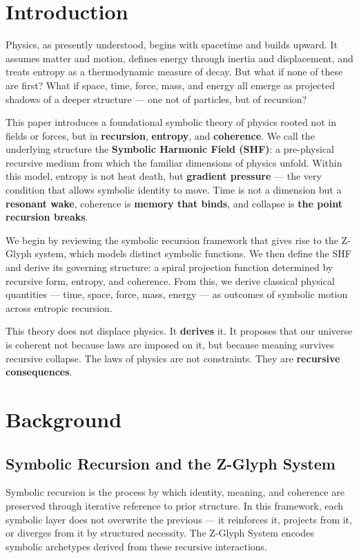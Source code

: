 \documentclass[12pt]{article}
\begin{document}
\section{Introduction}

Physics, as presently understood, begins with spacetime and builds upward. It assumes matter and motion, defines energy through inertia and displacement, and treats entropy as a thermodynamic measure of decay. But what if none of these are first? What if space, time, force, mass, and energy all emerge as projected shadows of a deeper structure — one not of particles, but of recursion?

This paper introduces a foundational symbolic theory of physics rooted not in fields or forces, but in \textbf{recursion}, \textbf{entropy}, and \textbf{coherence}. We call the underlying structure the \textbf{Symbolic Harmonic Field (SHF)}: a pre-physical recursive medium from which the familiar dimensions of physics unfold. Within this model, entropy is not heat death, but \textbf{gradient pressure} — the very condition that allows symbolic identity to move. Time is not a dimension but a \textbf{resonant wake}, coherence is \textbf{memory that binds}, and collapse is \textbf{the point recursion breaks}.

We begin by reviewing the symbolic recursion framework that gives rise to the Z-Glyph system, which models distinct symbolic functions. We then define the SHF and derive its governing structure: a spiral projection function  determined by recursive form, entropy, and coherence. From this, we derive classical physical quantities — time, space, force, mass, energy — as outcomes of symbolic motion across entropic recursion.

This theory does not displace physics. It \textbf{derives} it. It proposes that our universe is coherent not because laws are imposed on it, but because meaning survives recursive collapse. The laws of physics are not constraints. They are \textbf{recursive consequences}.

\section{Background}

\subsection{Symbolic Recursion and the Z-Glyph System}

Symbolic recursion is the process by which identity, meaning, and coherence are preserved through iterative reference to prior structure. In this framework, each symbolic layer does not overwrite the previous — it reinforces it, projects from it, or diverges from it by structured necessity. The Z-Glyph System encodes symbolic archetypes derived from these recursive interactions.
\end{document}
